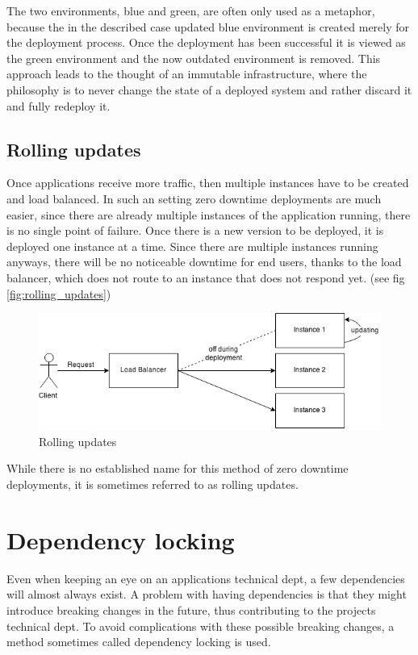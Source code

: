 The two environments, blue and green, are often only used as a metaphor,
because the in the described case updated blue environment is created merely
for the deployment process. Once the deployment has been successful it is
viewed as the green environment and the now outdated environment is removed.
This approach leads to the thought of an immutable infrastructure, where the
philosophy is to never change the state of a deployed system and rather discard
it and fully redeploy it.

\subsection{Rolling updates}

Once applications receive more traffic, then multiple instances have to be
created and load balanced. In such an setting zero downtime deployments are
much easier, since there are already multiple instances of the application
running, there is no single point of failure. Once there is a new version to be
deployed, it is deployed one instance at a time. Since there are multiple
instances running anyways, there will be no noticeable downtime for end users,
thanks to the load balancer, which does not route to an instance that does not
respond yet. (see fig \ref{fig:rolling_updates})

\begin{figure}
  \includegraphics[scale=0.55]{pictures/rolling_updates.png}
  \caption{Rolling updates}
  \centering
  \label{fig:rollgin_updates}
\end{figure}

While there is no established name for this method of zero downtime
deployments, it is sometimes referred to as rolling updates.

\section{Dependency locking}

Even when keeping an eye on an applications technical dept, a few dependencies
will almost always exist. A problem with having dependencies is that they might
introduce breaking changes in the future, thus contributing to the projects
technical dept. To avoid complications with these possible breaking changes, a
method sometimes called dependency locking is used.

